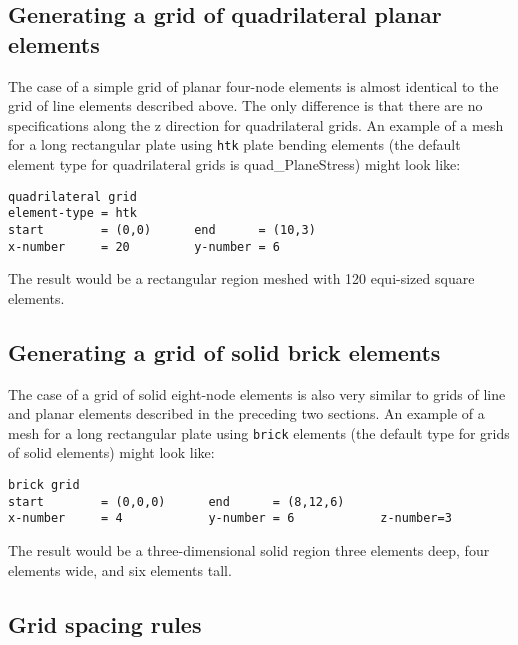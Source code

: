\subsection{Generating a grid of quadrilateral planar elements}

The case of a simple grid of planar four-node elements is almost identical
to the grid of line elements described above.  The only difference is that
there are no specifications along the z direction for quadrilateral grids.
An example of a mesh for a long rectangular plate using {\tt htk} plate
bending elements (the default element type for quadrilateral grids is
quad\_PlaneStress) might look like:
\begin{screen}
 \begin{verbatim}
quadrilateral grid
element-type = htk
start        = (0,0)      end      = (10,3)
x-number     = 20         y-number = 6
 \end{verbatim}
\end{screen}
The result would be a rectangular region meshed with 120 equi-sized square
elements.

\subsection{Generating a grid of solid brick elements}

The case of a grid of solid eight-node elements is also very similar to
grids of line and planar elements described in the preceding two sections.
An example of a mesh for a long rectangular plate using {\tt brick} 
elements (the default type for grids of solid elements) might look like:
\begin{screen}
 \begin{verbatim}
brick grid
start        = (0,0,0)      end      = (8,12,6)
x-number     = 4            y-number = 6            z-number=3           
 \end{verbatim}
\end{screen}
The result would be a three-dimensional solid region three elements deep,
four elements wide, and six elements tall.

\subsection{Grid spacing rules}
\label{grid_spacing_rules}

